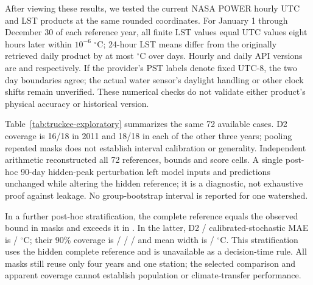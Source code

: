 After viewing these results, we tested the current NASA POWER hourly UTC and LST products at the same rounded coordinates. For January 1 through December 30 of each reference year, all \TruckeePowerPairs{} finite LST values equal UTC values eight hours later within $10^{-6}$ $^{\circ}$C; 24-hour LST means differ from the originally retrieved daily product by at most \TruckeePowerMaxDifference{} $^{\circ}$C over \TruckeePowerDays{} days. Hourly and daily API versions are \TruckeeHourlyVersion{} and \TruckeeDailyVersion{} respectively. If the provider's PST labels denote fixed UTC-8, the two day boundaries agree; the actual water sensor's daylight handling or other clock shifts remain unverified. These numerical checks do not validate either product's physical accuracy or historical version.

Table~\ref{tab:truckee-exploratory} summarizes the same 72 available cases. D2 coverage is 16/18 in 2011 and 18/18 in each of the other three years; pooling repeated masks does not establish interval calibration or generality. Independent arithmetic reconstructed all 72 references, bounds and score cells. A single post-hoc 90-day hidden-peak perturbation left model inputs and predictions unchanged while altering the hidden reference; it is a diagnostic, not exhaustive proof against leakage. No group-bootstrap interval is reported for one watershed.

In a further post-hoc stratification, the complete reference equals the observed bound in \TruckeeVisibleN{} masks and exceeds it in \TruckeeHiddenN{}. In the latter, D2 / calibrated-stochastic MAE is \TruckeeHiddenDTwoMAE{} / \TruckeeHiddenStochasticMAE{} $^{\circ}$C; their 90\% coverage is \TruckeeHiddenDTwoCovered/\TruckeeHiddenN{} / \TruckeeHiddenStochasticCovered/\TruckeeHiddenN{} and mean width is \TruckeeHiddenDTwoWidth{} / \TruckeeHiddenStochasticWidth{} $^{\circ}$C. This stratification uses the hidden complete reference and is unavailable as a decision-time rule. All masks still reuse only four years and one station; the selected comparison and apparent coverage cannot establish population or climate-transfer performance.

